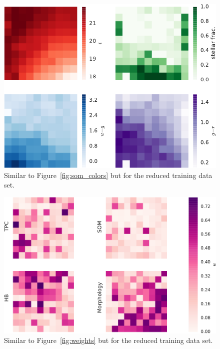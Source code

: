 \documentclass[useAMS,usenatbib]{mn2e}
\begin{document}



\begin{figure}
  \includegraphics[width=\columnwidth]{figures/som_colors_cut.pdf}
  \caption{Similar to Figure~\ref{fig:som_colors}
           but for the reduced training data set. }
  \label{fig:som_colors_cut}
\end{figure}

\begin{figure}
  \includegraphics[width=\columnwidth]{figures/weights_cut.pdf}
  \caption{Similar to Figure~\ref{fig:weights}
           but for the reduced training data set. }
  \label{fig:weights_cut}
\end{figure}
\end{document}
